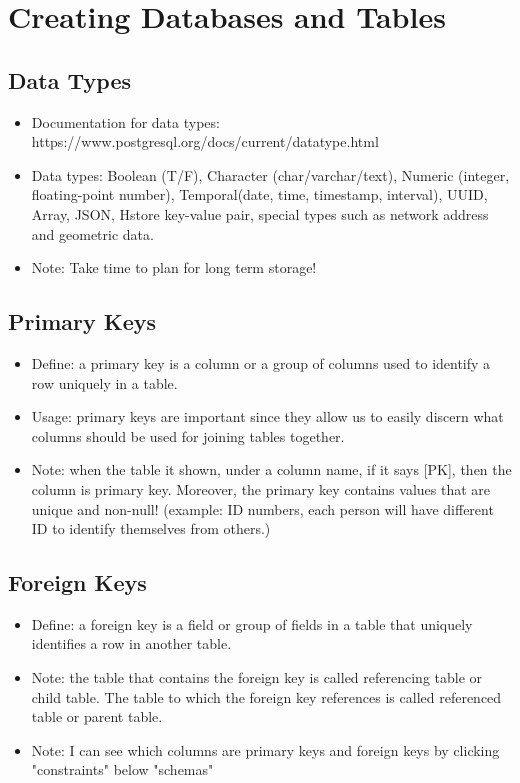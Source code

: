 \documentclass[a4paper]{article}
\begin{document}
\section{Creating Databases and Tables}

\subsection{Data Types}
\begin{itemize}
  \item Documentation for data types: https://www.postgresql.org/docs/current/datatype.html
  \item Data types: Boolean (T/F), Character (char/varchar/text), Numeric (integer, floating-point number), Temporal(date, time, timestamp, interval), UUID, Array, JSON, Hstore key-value pair, special types such as network address and geometric data. 
  \item Note: Take time to plan for long term storage!
\end{itemize}

\subsection{Primary Keys}
\begin{itemize}
  \item Define: a primary key is a column or a group of columns used to identify a row uniquely in a table.
  \item Usage: primary keys are important since they allow us to easily discern what columns should be used for joining tables together.
  \item Note: when the table it shown, under a column name, if it says [PK], then the column is primary key. Moreover, the primary key contains values that are unique and non-null! (example: ID numbers, each person will have different ID to identify themselves from others.)
\end{itemize}

\subsection{Foreign Keys}
\begin{itemize}
  \item Define: a foreign key is a field or group of fields in a table that uniquely identifies a row in another table. 
  \item Note: the table that contains the foreign key is called referencing table or child table. The table to which the foreign key references is called referenced table or parent table. 
  \item Note: I can see which columns are primary keys and foreign keys by clicking "constraints" below "schemas"
\end{itemize}
\end{document}
